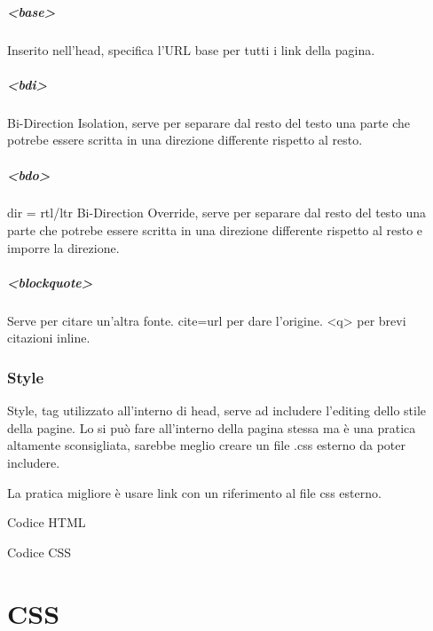 \documentclass[11pt,a4paper]{book}
\begin{document}
\paragraph{<base>}
Inserito nell'head, specifica l'URL base per tutti i link della pagina.

\paragraph{<bdi>}
Bi-Direction Isolation, serve per separare dal resto del testo una parte che potrebe essere scritta in una direzione differente rispetto al resto.	

\paragraph{<bdo>}
dir = rtl/ltr
Bi-Direction Override, serve per separare dal resto del testo una parte che potrebe essere scritta in una direzione differente rispetto al resto e imporre la direzione.	

\paragraph{<blockquote>}
Serve per citare un'altra fonte. cite=url per dare l'origine.
<q> per brevi citazioni inline.

\subsection{Style}
Style, tag utilizzato all'interno di head, serve ad includere l'editing dello stile della pagine. Lo si può fare all'interno della pagina stessa ma è una pratica altamente sconsigliata, sarebbe meglio creare un file .css esterno da poter includere.

La pratica migliore è usare link con un riferimento al file css esterno.

\begin{center}
	\begin{huge}
		Codice HTML
	\end{huge}
\end{center}


\begin{center}
	\begin{huge}
		Codice CSS
	\end{huge}
\end{center}

\chapter{CSS}
\end{document}

